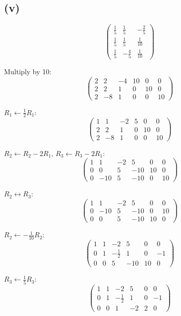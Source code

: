 \subsection*{(v)}
\[
	\begin{pmatrix}
		\frac{1}{5} & \frac{1}{5}  & -\frac{2}{5} \\
		\frac{1}{5} & \frac{1}{5}  & \frac{1}{10} \\
		\frac{1}{5} & -\frac{4}{5} & \frac{1}{10}
	\end{pmatrix}
\]

Multiply by 10:
\[
	\left(\begin{array}{ccc|ccc}
			2 & 2  & -4 & 10 & 0  & 0  \\
			2 & 2  & 1  & 0  & 10 & 0  \\
			2 & -8 & 1  & 0  & 0  & 10
		\end{array}\right)
\]

$R_1 \leftarrow \frac{1}{2}R_1$:
\[
	\left(\begin{array}{ccc|ccc}
			1 & 1  & -2 & 5 & 0  & 0  \\
			2 & 2  & 1  & 0 & 10 & 0  \\
			2 & -8 & 1  & 0 & 0  & 10
		\end{array}\right)
\]

$R_2 \leftarrow R_2 - 2R_1$, $R_3 \leftarrow R_3 - 2R_1$:
\[
	\left(\begin{array}{ccc|ccc}
			1 & 1   & -2 & 5   & 0  & 0  \\
			0 & 0   & 5  & -10 & 10 & 0  \\
			0 & -10 & 5  & -10 & 0  & 10
		\end{array}\right)
\]

$R_2 \leftrightarrow R_3$:
\[
	\left(\begin{array}{ccc|ccc}
			1 & 1   & -2 & 5   & 0  & 0  \\
			0 & -10 & 5  & -10 & 0  & 10 \\
			0 & 0   & 5  & -10 & 10 & 0
		\end{array}\right)
\]

$R_2 \leftarrow -\frac{1}{10}R_2$:
\[
	\left(\begin{array}{ccc|ccc}
			1 & 1 & -2           & 5   & 0  & 0  \\
			0 & 1 & -\frac{1}{2} & 1   & 0  & -1 \\
			0 & 0 & 5            & -10 & 10 & 0
		\end{array}\right)
\]

$R_3 \leftarrow \frac{1}{5}R_3$:
\[
	\left(\begin{array}{ccc|ccc}
			1 & 1 & -2           & 5  & 0 & 0  \\
			0 & 1 & -\frac{1}{2} & 1  & 0 & -1 \\
			0 & 0 & 1            & -2 & 2 & 0
		\end{array}\right)
\]

